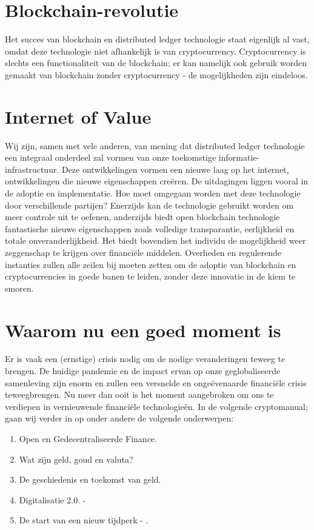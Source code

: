 \section*{Blockchain-revolutie}
Het succes van blockchain en distributed ledger technologie staat eigenlijk al vast, omdat deze technologie niet afhankelijk is van cryptocurrency. Cryptocurrency is slechts een functionaliteit van de blockchain; er kan namelijk ook gebruik worden gemaakt van blockchain zonder cryptocurrency - de mogelijkheden zijn eindeloos. 

\section*{Internet of Value}
Wij zijn, samen met vele anderen, van mening dat distributed ledger technologie een integraal onderdeel zal vormen van onze toekomstige informatie-infrastructuur. Deze ontwikkelingen vormen een nieuwe laag op het internet, ontwikkelingen die nieuwe eigenschappen cre\"eren. De uitdagingen liggen vooral in de adoptie en implementatie. Hoe moet omgegaan worden met deze technologie door verschillende partijen? Enerzijds kan de technologie gebruikt worden om meer controle uit te oefenen, anderzijds biedt open blockchain technologie fantastische nieuwe eigenschappen zoals volledige transparantie, eerlijkheid en totale onveranderlijkheid. Het biedt bovendien het individu de mogelijkheid weer zeggenschap te krijgen over financi{\"e}le middelen. Overheden en regulerende instanties zullen alle zeilen bij moeten zetten om de adoptie van blockchain en cryptocurrencies in goede banen te leiden, zonder deze innovatie in de kiem te smoren. 


\newpage 

\section*{Waarom nu een goed moment is}
Er is vaak een (ernstige) crisis nodig om de nodige veranderingen teweeg te brengen. De huidige pandemie en de impact ervan op onze geglobaliseerde samenleving zijn enorm  en zullen een versnelde en onge{\"e}venaarde financi{\"e}le crisis teweegbrengen. Nu meer dan ooit is het moment aangebroken om ons te verdiepen in vernieuwende financi{\"e}le technologie{\"e}n.
In de volgende {\selectfont cryptomanual};  gaan wij verder in op onder andere de volgende onderwerpen:

\begin{enumerate}[label=(\alph*)]
  \setlength\itemsep{0em}
    \item Open en Gedecentraliseerde Finance.
    \item Wat zijn geld, goud en valuta?
    \item De geschiedenis en toekomst van geld.
    \item Digitalisatie 2.0. - 
    \item De start van een nieuw tijdperk - .
\end{enumerate}



